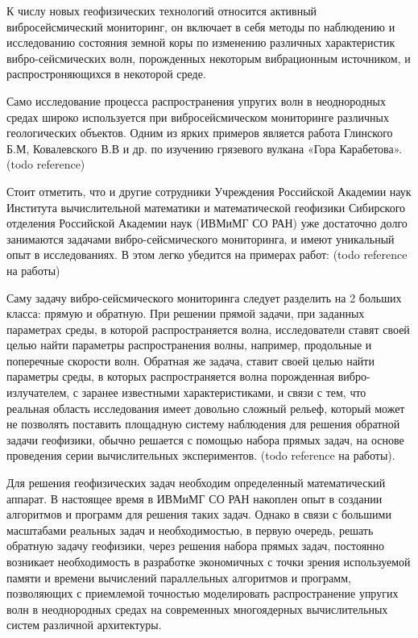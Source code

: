 
К числу новых геофизических технологий относится активный вибросейсмический мониторинг, 
он включает в себя методы по наблюдению и исследованию состояния земной коры по изменению 
различных характеристик вибро-сейсмических волн, порожденных некоторым вибрационным источником, 
и распростроняющихся в некоторой среде. 

Само исследование процесса распространения упругих волн в неоднородных средах широко
используется при вибросейсмическом мониторинге различных геологических объектов.
Одним из ярких примеров является работа Глинского Б.М, Ковалевского В.В и др. по изучению 
грязевого вулкана «Гора Карабетова». (todo reference)

Стоит отметить, что и другие сотрудники Учреждения Российской Академии наук Института
вычислительной математики и математической геофизики Сибирского
отделения Российской Академии наук (ИВМиМГ СО РАН) уже достаточно долго занимаются
задачами вибро-сейсмического мониторинга, и имеют уникальный опыт в исследованиях.
В этом легко убедится на примерах работ: (todo reference на работы)

Саму задачу вибро-сейсмического мониторинга следует разделить на 2 больших класса: прямую и обратную.
При решении прямой задачи, при заданных параметрах среды, в которой распространяется волна, 
исследователи ставят своей целью найти параметры распространения волны, например, 
продольные и поперечные скорости волн. Обратная же задача, ставит своей целью найти параметры среды, 
в которых распространяется волна порожденная вибро-излучателем, с заранее известными характеристиками, 
и связи с тем, что реальная область исследования имеет довольно сложный рельеф,
который может не позволять поставить площадную систему наблюдения для решения обратной задачи геофизики,
обычно решается с помощью набора прямых задач, на основе проведения серии вычислительных
экспериментов. (todo reference на работы).

Для решения геофизических задач необходим определенный математический аппарат. 
В настоящее время в ИВМиМГ СО РАН накоплен опыт в создании алгоритмов и программ для решения таких задач.
Однако в связи с большими масштабами реальных задач и необходимостью, в первую очередь, решать обратную
задачу геофизики, через решения набора прямых задач, постоянно возникает необходимость в
разработке экономичных с точки зрения используемой памяти и времени вычислений
параллельных алгоритмов и программ, позволяющих с приемлемой точностью
моделировать распространение упругих волн в неоднородных средах на 
современных многоядерных вычислительных систем различной архитектуры.

